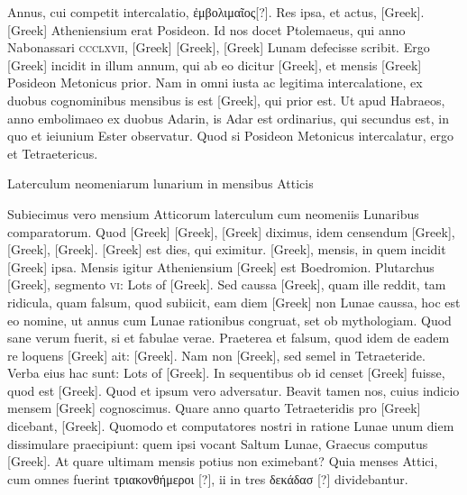 Annus, cui competit intercalatio, \textgreek{ἐμβολιμαῖος[?]}.
Res ipsa, et
actus, \textgreek{[Greek]}.
\textgreek{[Greek]} Atheniensium erat Posideon.
Id nos
docet Ptolemaeus, qui anno Nabonassari \textsc{ccclxvii}, \textgreek{[Greek]}
\textgreek{[Greek]}, \textgreek{[Greek]} Lunam defecisse scribit.
Ergo \textgreek{[Greek]} incidit in illum annum, qui ab eo dicitur
 \textgreek{[Greek]}, et mensis \textgreek{[Greek]} Posideon Metonicus prior.
Nam in omni
iusta ac legitima intercalatione, ex duobus
cognominibus mensibus is est \textgreek{[Greek]},
qui prior est.
Ut apud Habraeos, anno
embolimaeo ex duobus Adarin, is Adar
est ordinarius, qui secundus est, in quo et
ieiunium Ester observatur.
Quod si Posideon
Metonicus intercalatur, ergo et Tetraetericus.
\begin{table}[htbp]
 \centering
 
 \caption{Laterculum neomeniarum lunarium in mensibus Atticis}
 \label{tab:neomeniarum_lunarium}
\end{table}
Subiecimus vero mensium Atticorum
laterculum cum neomeniis Lunaribus
comparatorum.
Quod \textgreek{[Greek]}
\textgreek{[Greek]}, \textgreek{[Greek]} diximus,
idem censendum \textgreek{[Greek]}, \textgreek{[Greek]},
\textgreek{[Greek]}.
\textgreek{[Greek]} est dies, qui eximitur.
\textgreek{[Greek]}, mensis, in quem incidit
 \textgreek{[Greek]} ipsa.
Mensis igitur Atheniensium
\textgreek{[Greek]} est Boedromion.
Plutarchus \textgreek{[Greek]}, segmento
\textsc{vi}: \textgreek{Lots of [Greek]}.
Sed caussa
\textgreek{[Greek]}, quam ille reddit, tam ridicula, quam falsum,
 quod subiicit,
eam diem \textgreek{[Greek]} non Lunae caussa, hoc est eo nomine, ut
annus cum Lunae rationibus congruat, set ob mythologiam.
Quod
sane verum fuerit, si et fabulae verae.
Praeterea et falsum, quod idem
de eadem re loquens \textgreek{[Greek]} ait: \textgreek{[Greek]}.
Nam non \textgreek{[Greek]}, sed semel in Tetraeteride.
Verba eius
hac sunt: \textgreek{Lots of [Greek]}.
In sequentibus ob id censet \textgreek{[Greek]} fuisse,
 quod est \textgreek{[Greek]}.
Quod et ipsum vero adversatur.
Beavit tamen nos, cuius
indicio mensem \textgreek{[Greek]} cognoscimus.
Quare anno quarto
Tetraeteridis pro \textgreek{[Greek]} dicebant, \textgreek{[Greek]}.
Quomodo
et computatores nostri in ratione Lunae unum diem dissimulare
praecipiunt: quem ipsi vocant Saltum Lunae,
 Graecus computus \textgreek{[Greek]}.
At quare ultimam mensis potius non eximebant?
Quia
menses Attici, cum omnes fuerint \textgreek{τριακονθήμεροι [?]},
 ii in tres \textgreek{δεκάδασ [?]} dividebantur.

